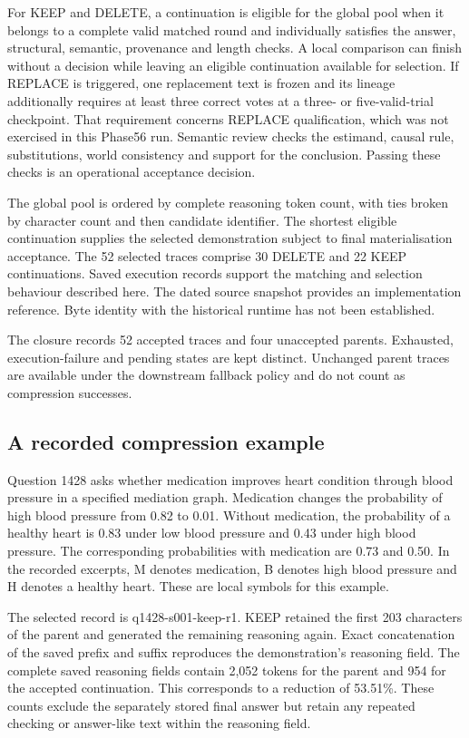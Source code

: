 For KEEP and DELETE, a continuation is eligible for the global pool when it belongs to a complete valid matched round and individually satisfies the answer, structural, semantic, provenance and length checks. A local comparison can finish without a decision while leaving an eligible continuation available for selection. If REPLACE is triggered, one replacement text is frozen and its lineage additionally requires at least three correct votes at a three- or five-valid-trial checkpoint. That requirement concerns REPLACE qualification, which was not exercised in this Phase56 run. Semantic review checks the estimand, causal rule, substitutions, world consistency and support for the conclusion. Passing these checks is an operational acceptance decision.

The global pool is ordered by complete reasoning token count, with ties broken by character count and then candidate identifier. The shortest eligible continuation supplies the selected demonstration subject to final materialisation acceptance. The 52 selected traces comprise 30 DELETE and 22 KEEP continuations. Saved execution records support the matching and selection behaviour described here. The dated source snapshot provides an implementation reference. Byte identity with the historical runtime has not been established.

The closure records 52 accepted traces and four unaccepted parents. Exhausted, execution-failure and pending states are kept distinct. Unchanged parent traces are available under the downstream fallback policy and do not count as compression successes.

\subsection{A recorded compression example}\label{sec:3.5.1}

Question 1428 asks whether medication improves heart condition through blood pressure in a specified mediation graph. Medication changes the probability of high blood pressure from 0.82 to 0.01. Without medication, the probability of a healthy heart is 0.83 under low blood pressure and 0.43 under high blood pressure. The corresponding probabilities with medication are 0.73 and 0.50. In the recorded excerpts, M denotes medication, B denotes high blood pressure and H denotes a healthy heart. These are local symbols for this example.

The selected record is q1428-s001-keep-r1. KEEP retained the first 203 characters of the parent and generated the remaining reasoning again. Exact concatenation of the saved prefix and suffix reproduces the demonstration's reasoning field. The complete saved reasoning fields contain 2,052 tokens for the parent and 954 for the accepted continuation. This corresponds to a reduction of 53.51\%. These counts exclude the separately stored final answer but retain any repeated checking or answer-like text within the reasoning field.

